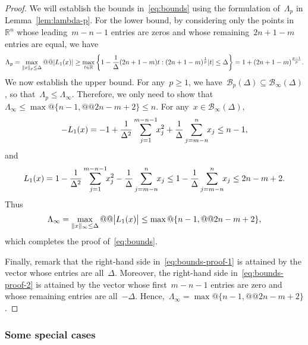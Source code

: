 \documentclass{article}
\theoremstyle{definition}
\theoremstyle{plain}
\theoremstyle{remark}
\newcommand*{\abs}[2][]{#1\lvert#2#1\rvert}
\newcommand*{\norm}[2][]{#1\lVert#2#1\rVert}
\newcommand*{\set}[2][]{#1\{#2#1\}}
\newcommand*{\R}{\mathbb{R}}
\newcommand*{\lagp}[1][]{L\ifblank{#1}{}{_{#1}}}
\begin{document}
\begin{proof}
    We will establish the bounds in~\eqref{eq:bounds} using the formulation of~$\Lambda_p$ in Lemma~\ref{lem:lambda-p}.
    For the lower bound, by considering only the points in~$\R^n$ whose leading~$m - n - 1$ entries are zeros and whose remaining~$2n + 1 - m$ entries are equal, we have
    \begin{equation*}
        \Lambda_p = \max_{\norm{x}_p \le \Delta} @@ \abs{\lagp[1](x)} \ge \max_{t \in \R} \set[\bigg]{1 - \frac{1}{\Delta} (2n + 1 - m) t : (2n + 1 - m)^{\frac{1}{p}}\abs{t} \le \Delta} = 1 + (2n + 1 - m)^{\frac{p - 1}{p}}.
    \end{equation*}
    We now establish the upper bound.
    For any~$p \ge 1$, we have~$\mathcal{B}_p(\Delta) \subseteq \mathcal{B}_{\infty}(\Delta)$, so that~$\Lambda_p \le \Lambda_{\infty}$.
    Therefore, we only need to show that~$\Lambda_{\infty} \le \max @ \set{n - 1, @@ 2n - m + 2} \le n$.
    For any~$x \in \mathcal{B}_{\infty}(\Delta)$,
    \begin{equation}
        \label{eq:bounds-proof-1}
        -\lagp[1](x) = -1 + \frac{1}{\Delta^2} \sum_{j = 1}^{m - n - 1} \!\! x_j^2 + \frac{1}{\Delta} \sum_{j = m - n}^n \!\! x_j \le n-1,
    \end{equation}
    and
    \begin{equation}
        \label{eq:bounds-proof-2}
        \lagp[1](x) = 1 - \frac{1}{\Delta^2} \sum_{j = 1}^{m - n - 1} \!\! x_j^2 - \frac{1}{\Delta} \sum_{j = m - n}^n \!\! x_j \le 1 -  \frac{1}{\Delta} \sum_{j = m - n}^n \!\! x_j \le 2n-m+2.
    \end{equation}
    Thus
    \begin{equation*}
        \Lambda_{\infty} = \max_{\norm{x}_{\infty} \le \Delta} @@ \abs[\big]{\lagp[1](x)} \le \max @ \set{n - 1, @@ 2n - m + 2},
    \end{equation*}
    which completes the proof of~\eqref{eq:bounds}.

    Finally, remark that the right-hand side in~\eqref{eq:bounds-proof-1} is attained by the vector whose entries are all~$\Delta$.
    Moreover, the right-hand side in~\eqref{eq:bounds-proof-2} is attained by the vector whose first~$m - n - 1$ entries are zero and whose remaining entries are all~$-\Delta$.
    Hence,~$\Lambda_{\infty} = \max @ \set{n - 1, @@ 2n - m + 2}$.
\end{proof}

\subsubsection{Some special cases}
\end{document}
